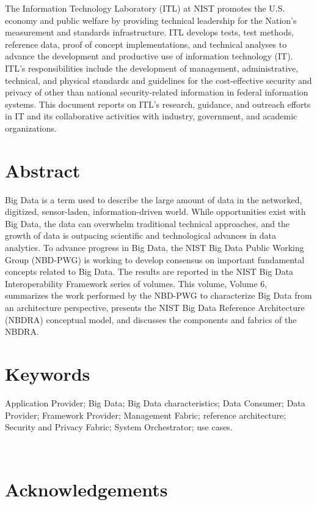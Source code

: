 \documentclass[11pt]{article}
\begin{document}
The Information Technology Laboratory (ITL) at NIST promotes the U.S. economy and public welfare by 
providing technical leadership for the Nation’s measurement and standards infrastructure. ITL develops 
tests, test methods, reference data, proof of concept implementations, and technical analyses to advance 
the development and productive use of information technology (IT). ITL’s responsibilities include the 
development of management, administrative, technical, and physical standards and guidelines for the 
cost-effective security and privacy of other than national security-related information in federal 
information systems. This document reports on ITL’s research, guidance, and outreach efforts in IT and 
its collaborative activities with industry, government, and academic organizations.

\section*{Abstract}

Big Data is a term used to describe the large amount of data in the networked, digitized, sensor-laden, 
information-driven world. While opportunities exist with Big Data, the data can overwhelm traditional 
technical approaches, and the growth of data is outpacing scientific and technological advances in data 
analytics. To advance progress in Big Data, the NIST Big Data Public Working Group (NBD-PWG) is 
working to develop consensus on important fundamental concepts related to Big Data. The results are 
reported in the NIST Big Data Interoperability Framework series of volumes. This volume, Volume 6, 
summarizes the work performed by the NBD-PWG to characterize Big Data from an architecture 
perspective, presents the NIST Big Data Reference Architecture (NBDRA) conceptual model, and 
discusses the components and fabrics of the NBDRA. 



\section*{Keywords}

Application Provider; Big Data; Big Data characteristics; Data Consumer; Data Provider; Framework 
Provider; Management Fabric; reference architecture; Security and Privacy Fabric; System Orchestrator; 
use cases. 


 
\section*{Acknowledgements}
\end{document}
